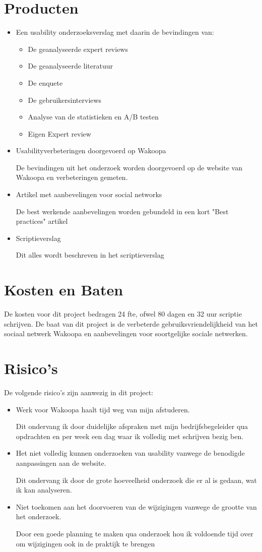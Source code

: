 \documentclass[a4paper, 10pt, twoside, pdftex]{article}
\begin{document}
\section{Producten}
\begin{itemize}
\item
Een usability onderzoeksverslag met daarin de bevindingen van:
  \begin{itemize}
  \item
  De geanalyseerde expert reviews
  \item
  De geanalyseerde literatuur
  \item
  De enquete
  \item
  De gebruikersinterviews
  \item
  Analyse van de statistieken en A/B testen
  \item
  Eigen Expert review
  \end{itemize}
\item
Usabilityverbeteringen doorgevoerd op Wakoopa

De bevindingen uit het onderzoek worden doorgevoerd op de website van Wakoopa en verbeteringen gemeten.
\item
Artikel met aanbevelingen voor social networks

De best werkende aanbevelingen worden gebundeld in een kort "Best practices" artikel
\item
Scriptieverslag

Dit alles wordt beschreven in het scriptieverslag
\end{itemize}


\section{Kosten en Baten}
De kosten voor dit project bedragen 24 fte, ofwel 80 dagen en 32 uur scriptie schrijven. De baat van dit project is de verbeterde
gebruiksvriendelijkheid van het sociaal netwerk Wakoopa en aanbevelingen voor soortgelijke sociale netwerken.

\section{Risico's}
De volgende risico's zijn aanwezig in dit project:

\begin{itemize}
\item
Werk voor Wakoopa haalt tijd weg van mijn afstuderen.

Dit ondervang ik door duidelijke afspraken met mijn bedrijfsbegeleider qua opdrachten en per week een dag waar ik volledig met schrijven bezig ben.
\item
Het niet volledig kunnen onderzoeken van usability vanwege de benodigde aanpassingen aan de website.

Dit ondervang ik door de grote hoeveelheid onderzoek die er al is gedaan, wat ik kan analyseren.
\item
Niet toekomen aan het doorvoeren van de wijzigingen vanwege de grootte van het onderzoek.

Door een goede planning te maken qua onderzoek hou ik voldoende tijd over om wijzigingen ook in de praktijk te brengen
\end{itemize}
\end{document}
